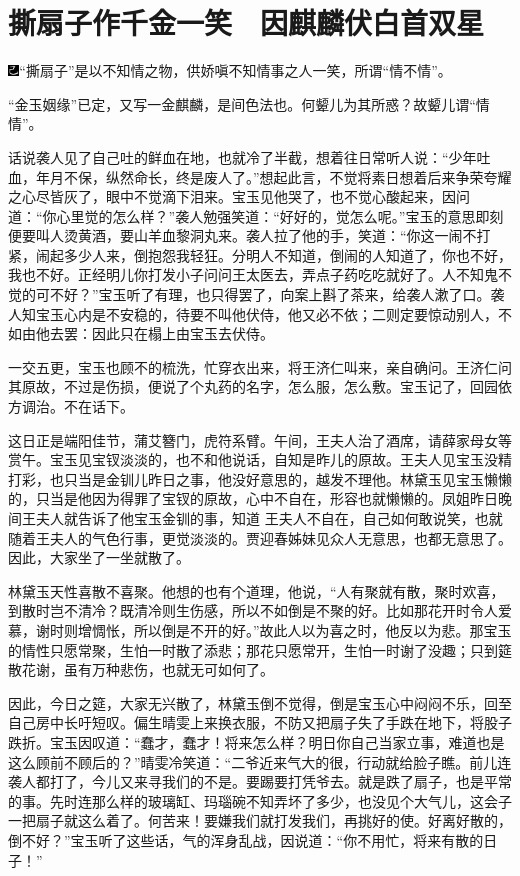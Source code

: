 

\chapter{撕扇子作千金一笑　因麒麟伏白首双星}\label{part0035_split_000.htmlux5cux23calibre_pb_0}

{\includegraphics[width=3mm]{../Images/00003}``撕扇子''是以不知情之物，供娇嗔不知情事之人一笑，所谓``情不情''。}

{``金玉姻缘''已定，又写一金麒麟，是间色法也。何颦儿为其所惑？故颦儿谓``情情''。}

话说袭人见了自己吐的鲜血在地，也就冷了半截，想着往日常听人说：``少年吐血，年月不保，纵然命长，终是废人了。''想起此言，不觉将素日想着后来争荣夸耀之心尽皆灰了，眼中不觉滴下泪来。宝玉见他哭了，也不觉心酸起来，因问道：``你心里觉的怎么样？''袭人勉强笑道：``好好的，觉怎么呢。''宝玉的意思即刻便要叫人烫黄酒，要山羊血黎洞丸来。袭人拉了他的手，笑道：``你这一闹不打紧，闹起多少人来，倒抱怨我轻狂。分明人不知道，倒闹的人知道了，你也不好，我也不好。正经明儿你打发小子问问王太医去，弄点子药吃吃就好了。人不知鬼不觉的可不好？''宝玉听了有理，也只得罢了，向案上斟了茶来，给袭人漱了口。袭人知宝玉心内是不安稳的，待要不叫他伏侍，他又必不依；二则定要惊动别人，不如由他去罢：因此只在榻上由宝玉去伏侍。

一交五更，宝玉也顾不的梳洗，忙穿衣出来，将王济仁叫来，亲自确问。王济仁问其原故，不过是伤损，便说了个丸药的名字，怎么服，怎么敷。宝玉记了，回园依方调治。不在话下。

这日正是端阳佳节，蒲艾簪门，虎符系臂。午间，王夫人治了酒席，请薛家母女等赏午。宝玉见宝钗淡淡的，也不和他说话，自知是昨儿的原故。王夫人见宝玉没精打彩，也只当是金钏儿昨日之事，他没好意思的，越发不理他。林黛玉见宝玉懒懒的，只当是他因为得罪了宝钗的原故，心中不自在，形容也就懒懒的。凤姐昨日晚间王夫人就告诉了他宝玉金钏的事，知道
王夫人不自在，自己如何敢说笑，也就随着王夫人的气色行事，更觉淡淡的。贾迎春姊妹见众人无意思，也都无意思了。因此，大家坐了一坐就散了。

林黛玉天性喜散不喜聚。他想的也有个道理，他说，``人有聚就有散，聚时欢喜，到散时岂不清冷？既清冷则生伤感，所以不如倒是不聚的好。比如那花开时令人爱慕，谢时则增惆怅，所以倒是不开的好。''故此人以为喜之时，他反以为悲。那宝玉的情性只愿常聚，生怕一时散了添悲；那花只愿常开，生怕一时谢了没趣；只到筵散花谢，虽有万种悲伤，也就无可如何了。

因此，今日之筵，大家无兴散了，林黛玉倒不觉得，倒是宝玉心中闷闷不乐，回至自己房中长吁短叹。偏生晴雯上来换衣服，不防又把扇子失了手跌在地下，将股子跌折。宝玉因叹道：``蠢才，蠢才！将来怎么样？明日你自己当家立事，难道也是这么顾前不顾后的？''晴雯冷笑道：``二爷近来气大的很，行动就给脸子瞧。前儿连袭人都打了，今儿又来寻我们的不是。要踢要打凭爷去。就是跌了扇子，也是平常的事。先时连那么样的玻璃缸、玛瑙碗不知弄坏了多少，也没见个大气儿，这会子一把扇子就这么着了。何苦来！要嫌我们就打发我们，再挑好的使。好离好散的，倒不好？''宝玉听了这些话，气的浑身乱战，因说道：``你不用忙，将来有散的日子！''

